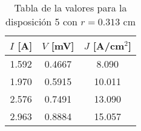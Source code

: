 \begin{table}[h!]
    \centering
\begin{tabular}{ccc}
\toprule
$I$ [A] & $V$ [mV] & $J$ [A/cm$^2$] \\
\midrule
1.592 & 0.4667 & 8.090 \\
1.970 & 0.5915 & 10.011 \\
2.576 & 0.7491 & 13.090 \\
2.963 & 0.8884 & 15.057 \\
\bottomrule
\end{tabular}
    \caption{Tabla de la valores para la disposición 5 con $r=0.313$ cm}
    \label{Tab:VIJ_5}
\end{table}

